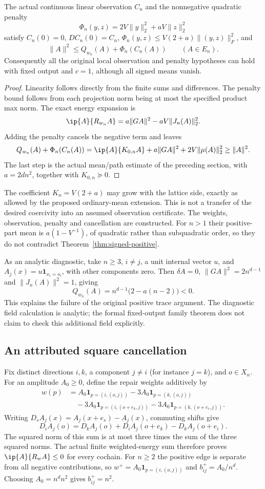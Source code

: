 \begin{proposition}\label{prop:signed-zero}
The actual continuous linear observation $C_n$ and the nonnegative
quadratic penalty
\[
 \Phi_n(y,z)=2V\|y\|_2^2+aV\|z\|_2^2
\]
satisfy $C_n(0)=0$, $DC_n(0)=C_n$,
$\Phi_n(y,z)\leq V(2+a)\|(y,z)\|_F^2$, and
\[
 \|A\|^2\leq Q_{w_n}(A)+\Phi_n(C_n(A))\qquad(A\in E_n).
\]
Consequently all the original local observation and penalty hypotheses
can hold with fixed output and $c=1$, although all signed means vanish.
\end{proposition}
\begin{proof}
Linearity follows directly from the finite sums and differences. The
penalty bound follows from each projection norm being at most the
specified product max norm. The exact energy expansion is
\[
 \ip{A}{R_{w_n}A}=a\|GA\|^2-aV\|J_n(A)\|_2^2.
\]
Adding the penalty cancels the negative term and leaves
\[
 Q_{w_n}(A)+\Phi_n(C_n(A))
   =\ip{A}{K_{0,n}A}+a\|GA\|^2+2V\|\mu(A)\|_2^2
   \geq\|A\|^2.
\]
The last step is the actual mean/path estimate of the preceding section,
with $a=2dn^2$, together with $K_{0,n}\succeq0$.
\end{proof}
The coefficient $K_n=V(2+a)$ may grow with the lattice side, exactly as
allowed by the proposed ordinary-mean extension. This is not a transfer
of the desired coercivity into an assumed observation certificate.
The weights, observation, penalty and cancellation are constructed.
For $n>1$ their positive-part mean is $a(1-V^{-1})$, of quadratic rather
than subquadratic order, so they do not contradict
Theorem~\ref{thm:signed-positive}.

As an analytic diagnostic, take $n\geq3$, $i\ne j$, a unit internal vector
$u$, and $A_j(x)=u\mathbf1_{x_i=o_i}$, with other components zero. Then
$\delta A=0$, $\|GA\|^2=2n^{d-1}$ and $\|J_n(A)\|^2=1$, giving
\[
 Q_{w_n}(A)=n^{d-1}\bigl(2-a(n-2)\bigr)<0.
\]
This explains the failure of the original positive trace argument.
The diagnostic field calculation is analytic; the formal fixed-output
family theorem does not claim to check this additional field explicitly.

\subsection{An attributed square cancellation}
Fix distinct directions $i,k$, a component $j\ne i$ (for instance $j=k$),
and $o\in X_n$. For an amplitude $A_0\geq0$, define the repair
weights additively by
\begin{align*}
 w(p)&=A_0\mathbf1_{p=(i,(o,j))}
       -3A_0\mathbf1_{p=(k,(o,j))}\\
     &\quad-3A_0\mathbf1_{p=(i,(o+e_k,j))}
       -3A_0\mathbf1_{p=(k,(o+e_i,j))}.
\end{align*}
Writing $D_s A_j(x)=A_j(x+e_s)-A_j(x)$, commuting shifts give
\[
 D_i A_j(o)=D_k A_j(o)+D_i A_j(o+e_k)-D_k A_j(o+e_i).
\]
The squared norm of this sum is at most three times the sum of the
three squared norms. The actual finite weighted-energy sum therefore
proves $\ip{A}{R_wA}\leq0$ for every cochain.
For $n\geq2$ the positive edge is separate from all negative contributions,
so $w^+=A_0\mathbf1_{p=(i,(o,j))}$ and $b^+_{ij}=A_0/n^d$.
Choosing $A_0=n^d n^2$ gives $b^+_{ij}=n^2$.

